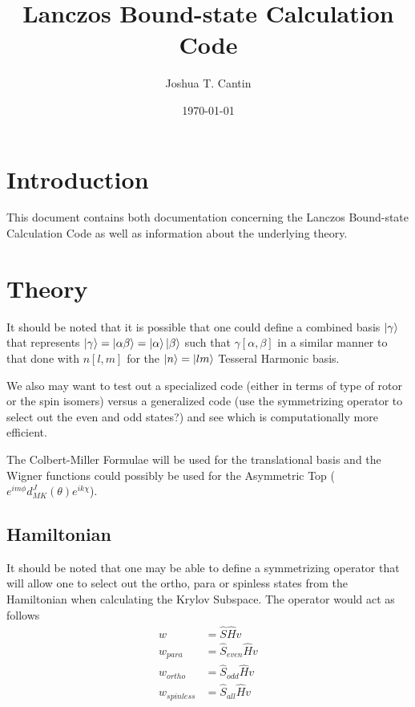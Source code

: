 \documentclass{revtex4-1}
\begin{document}
\title{Lanczos Bound-state Calculation Code}
\author{Joshua T. Cantin}
\date{\today}

\maketitle

\section{Introduction}\label{S:intro}
This document contains both documentation concerning the Lanczos Bound-state Calculation Code as well as information about the underlying theory.

\section{Theory}\label{S:theory}
It should be noted that it is possible that one could define a combined basis $\ket{\gamma}$ that represents $\ket{\gamma}=\ket{\alpha\beta}=\ket{\alpha}\ket{\beta}$ such that $\gamma[\alpha,\beta]$ in a similar manner to that done with $n[l,m]$ for the $\ket{n}=\ket{lm}$ Tesseral Harmonic basis.

We also may want to test out a specialized code (either in terms of type of rotor or the spin isomers) versus a generalized code (use the symmetrizing operator to select out the even and odd states?) and see which is computationally more efficient.

The Colbert-Miller Formulae will be used for the translational basis and the Wigner functions could possibly be used for the Asymmetric Top ($e^{im\phi}d^{J}_{MK}(\theta)e^{ik\chi}$).
\subsection{Hamiltonian}\label{S:Hamilton}
It should be noted that one may be able to define a symmetrizing operator that will allow one to select out the ortho, para or spinless states from the Hamiltonian when calculating the Krylov Subspace. The operator would act as follows
\begin{align*}
w &= \hat{S}\hat{H}v \\
w_{para} &= \hat{S}_{even}\hat{H}v \\
w_{ortho} &= \hat{S}_{odd}\hat{H}v \\
w_{spinless} &= \hat{S}_{all}\hat{H}v \\
\end{align*}
\end{document}
